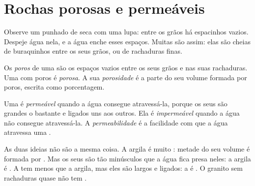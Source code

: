 \section{Rochas porosas e permeáveis}

Observe um punhado de  seca com uma lupa: entre os grãos há
espacinhos vazios. Despeje água nela, e a água enche esses espaços. Muitas
 são assim: elas são cheias de buraquinhos entre os seus grãos, ou
de rachaduras finas.

\begin{definition}[Porosidade]\label{def:g6:water-underground:porosity}
Os \emph{poros} de uma  são os espaços vazios entre os seus
grãos e nas suas rachaduras. Uma  com poros é \emph{porosa}. A
sua \emph{porosidade} é a parte do seu volume formada por
poros, escrita como porcentagem.
\end{definition}

\begin{definition}[Permeabilidade]\label{def:g6:water-underground:permeability}
Uma  é \emph{permeável} quando a água consegue
atravessá-la, porque os seus  são grandes o bastante e ligados uns aos
outros. Ela é \emph{impermeável} quando a água não
consegue atravessá-la. A \emph{permeabilidade} é a
facilidade com que a água atravessa uma .
\end{definition}

As duas ideias não são a mesma coisa. A argila é muito : metade do
seu volume é formada por . Mas os seus  são tão minúsculos que a
água fica presa neles: a argila é \emph{}. A  tem menos
 que a argila, mas eles são largos e ligados: a  é
\emph{}. O granito sem rachaduras quase não tem .

